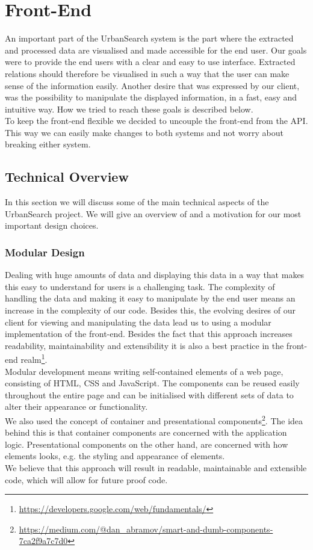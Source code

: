 \section{Front-End}\label{sec 5-front-end}
An important part of the UrbanSearch system is the part where the extracted and processed data are visualised and made accessible for the end user. Our goals were to provide the end users with a clear and easy to use interface. Extracted relations should therefore be visualised in such a way that the user can make sense of the information easily. Another desire that was expressed by our client, was the possibility to manipulate the displayed information, in a fast, easy and intuitive way. How we tried to reach these goals is described below.\\
To keep the front-end flexible we decided to uncouple the front-end from the API. This way we can easily make changes to both systems and not worry about breaking either system.

\subsection{Technical Overview}
In this section we will discuss some of the main technical aspects of the UrbanSearch project. We will give an overview of and a motivation for our most important design choices.

\subsubsection{Modular Design}
Dealing with huge amounts of data and displaying this data in a way that makes this easy to understand for users is a challenging task. The complexity of handling the data and making it easy to manipulate by the end user means an increase in the complexity of our code. Besides this, the evolving desires of our client for viewing and manipulating the data lead us to using a modular implementation of the front-end.
Besides the fact that this approach increases readability, maintainability and extensibility it is also a best practice in the front-end realm\footnote{\url{https://developers.google.com/web/fundamentals/}}.\\
Modular development means writing self-contained elements of a web page, consisting of HTML, CSS and JavaScript. The components can be reused easily throughout the entire page and can be initialised with different sets of data to alter their appearance or functionality.\\
We also used the concept of container and presentational components\footnote{\url{https://medium.com/@dan_abramov/smart-and-dumb-components-7ca2f9a7c7d0}}. The idea behind this is that container components are concerned with the application logic. Presentational components on the other hand, are concerned with how elements looks, e.g. the styling and appearance of elements.\\
We believe that this approach will result in readable, maintainable and extensible code, which will allow for future proof code.
